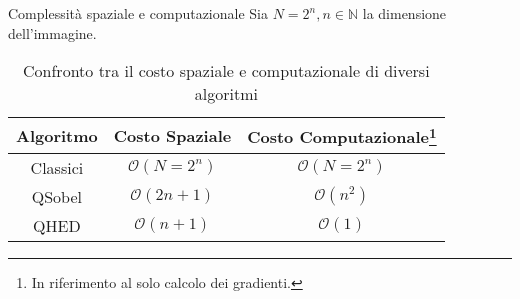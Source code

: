 \begin{frame}{Complessità spaziale e computazionale}
	Sia $N=2^n,n \in \mathbb{N}$ la dimensione dell'immagine.
	\begin{table}[h]
		\centering
		\renewcommand{\arraystretch}{1.5}
		\begin{tabular}{|c|c|c|}
			\hline
			\rowcolor{gray!20}  %
			\textbf{Algoritmo} & \textbf{Costo Spaziale} & \textbf{Costo Computazionale}\footnote{In riferimento al solo calcolo dei gradienti.} \\  
			\hline
			Classici & $\mathcal{O}(N=2^n)$ & $\mathcal{O}(N=2^n)$\\  
			\hline
			QSobel & $\mathcal{O}(2n+1)$ & $\mathcal{O}(n^2)$ \\  
			\hline
			\rowcolor{green!20}
			QHED & $\mathcal{O}(n+1)$ & $\mathcal{O}(1)$ \\  
			\hline
		\end{tabular}
		\caption{Confronto tra il costo spaziale e computazionale di diversi algoritmi}
		\label{tab:costo-spaziale-computazionale}
	\end{table}
\end{frame}
